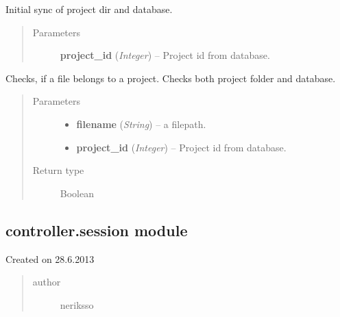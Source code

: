 \documentclass[letterpaper,10pt,english]{sphinxmanual}
\begin{document}
\begin{fulllineitems}
\label{controller:controller.project.init_sync_project_directory}
Initial sync of project dir and database.
\begin{quote}\begin{description}
\item[{Parameters}] \leavevmode
\textbf{project\_id} (\emph{Integer}) -- Project id from database.

\end{description}\end{quote}

\end{fulllineitems}


\begin{fulllineitems}
\label{controller:controller.project.is_project_file}
Checks, if a file belongs to a project. Checks both project folder
and database.
\begin{quote}\begin{description}
\item[{Parameters}] \leavevmode\begin{itemize}
\item {} 
\textbf{filename} (\emph{String}) -- a filepath.

\item {} 
\textbf{project\_id} (\emph{Integer}) -- Project id from database.

\end{itemize}

\item[{Return type}] \leavevmode
Boolean

\end{description}\end{quote}

\end{fulllineitems}



\subsection{controller.session module}
\label{controller:module-controller.session}\label{controller:controller-session-module}
Created on 28.6.2013
\begin{quote}\begin{description}
\item[{author}] \leavevmode
neriksso

\end{description}\end{quote}
\end{document}
